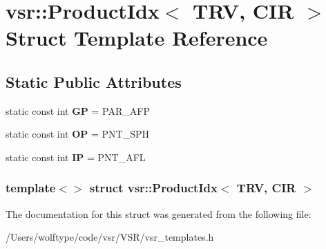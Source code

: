 \hypertarget{structvsr_1_1_product_idx_3_01_t_r_v_00_01_c_i_r_01_4}{\section{vsr\-:\-:Product\-Idx$<$ T\-R\-V, C\-I\-R $>$ Struct Template Reference}
\label{structvsr_1_1_product_idx_3_01_t_r_v_00_01_c_i_r_01_4}
}
\subsection*{Static Public Attributes}
\begin{DoxyCompactItemize}
\item 
\hypertarget{structvsr_1_1_product_idx_3_01_t_r_v_00_01_c_i_r_01_4_aca26798ba2cdaa8d19fd35c1a8a91b72}{static const int {\bfseries G\-P} = P\-A\-R\-\_\-\-A\-F\-P}\label{structvsr_1_1_product_idx_3_01_t_r_v_00_01_c_i_r_01_4_aca26798ba2cdaa8d19fd35c1a8a91b72}

\item 
\hypertarget{structvsr_1_1_product_idx_3_01_t_r_v_00_01_c_i_r_01_4_ab5bf8b46eac2d4ec98415e6de9b2478b}{static const int {\bfseries O\-P} = P\-N\-T\-\_\-\-S\-P\-H}\label{structvsr_1_1_product_idx_3_01_t_r_v_00_01_c_i_r_01_4_ab5bf8b46eac2d4ec98415e6de9b2478b}

\item 
\hypertarget{structvsr_1_1_product_idx_3_01_t_r_v_00_01_c_i_r_01_4_afe6118866c3c6c5920ccfda4f80271b9}{static const int {\bfseries I\-P} = P\-N\-T\-\_\-\-A\-F\-L}\label{structvsr_1_1_product_idx_3_01_t_r_v_00_01_c_i_r_01_4_afe6118866c3c6c5920ccfda4f80271b9}

\end{DoxyCompactItemize}
\subsubsection*{template$<$$>$ struct vsr\-::\-Product\-Idx$<$ T\-R\-V, C\-I\-R $>$}



The documentation for this struct was generated from the following file\-:\begin{DoxyCompactItemize}
\item 
/\-Users/wolftype/code/vsr/\-V\-S\-R/vsr\-\_\-templates.\-h\end{DoxyCompactItemize}
